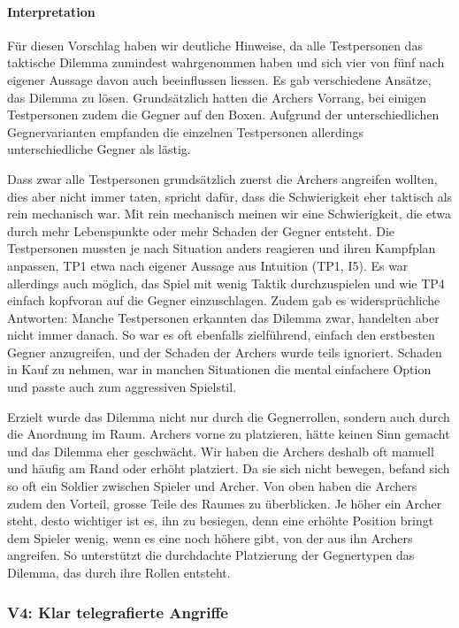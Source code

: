 \documentclass[../Main.tex]{subfiles}
\begin{document}
\paragraph{Interpretation}
Für diesen Vorschlag haben wir deutliche Hinweise, da alle Testpersonen das taktische Dilemma zumindest wahrgenommen haben und sich vier von fünf nach eigener Aussage davon auch beeinflussen liessen. Es gab verschiedene Ansätze, das Dilemma zu lösen. Grundsätzlich hatten die Archers Vorrang, bei einigen Testpersonen zudem die Gegner auf den Boxen. Aufgrund der unterschiedlichen Gegnervarianten empfanden die einzelnen Testpersonen allerdings unterschiedliche Gegner als lästig.

Dass zwar alle Testpersonen grundsätzlich zuerst die Archers angreifen wollten, dies aber nicht immer taten, spricht dafür, dass die Schwierigkeit eher taktisch als rein mechanisch war. Mit rein mechanisch meinen wir eine Schwierigkeit, die etwa durch mehr Lebenspunkte oder mehr Schaden der Gegner entsteht. Die Testpersonen mussten je nach Situation anders reagieren und ihren Kampfplan anpassen, TP1 etwa nach eigener Aussage aus Intuition (TP1, I5). Es war allerdings auch möglich, das Spiel mit wenig Taktik durchzuspielen und wie TP4 einfach kopfvoran auf die Gegner einzuschlagen. Zudem gab es widersprüchliche Antworten: Manche Testpersonen erkannten das Dilemma zwar, handelten aber nicht immer danach. So war es oft ebenfalls zielführend, einfach den erstbesten Gegner anzugreifen, und der Schaden der Archers wurde teils ignoriert. Schaden in Kauf zu nehmen, war in manchen Situationen die mental einfachere Option und passte auch zum aggressiven Spielstil.

Erzielt wurde das Dilemma nicht nur durch die Gegnerrollen, sondern auch durch die Anordnung im Raum. Archers vorne zu platzieren, hätte keinen Sinn gemacht und das Dilemma eher geschwächt. Wir haben die Archers deshalb oft manuell und häufig am Rand oder erhöht platziert. Da sie sich nicht bewegen, befand sich so oft ein Soldier zwischen Spieler und Archer. Von oben haben die Archers zudem den Vorteil, grosse Teile des Raumes zu überblicken. Je höher ein Archer steht, desto wichtiger ist es, ihn zu besiegen, denn eine erhöhte Position bringt dem Spieler wenig, wenn es eine noch höhere gibt, von der aus ihn Archers angreifen. So unterstützt die durchdachte Platzierung der Gegnertypen das Dilemma, das durch ihre Rollen entsteht.

\subsubsection{V4: Klar telegrafierte Angriffe}
\end{document}
